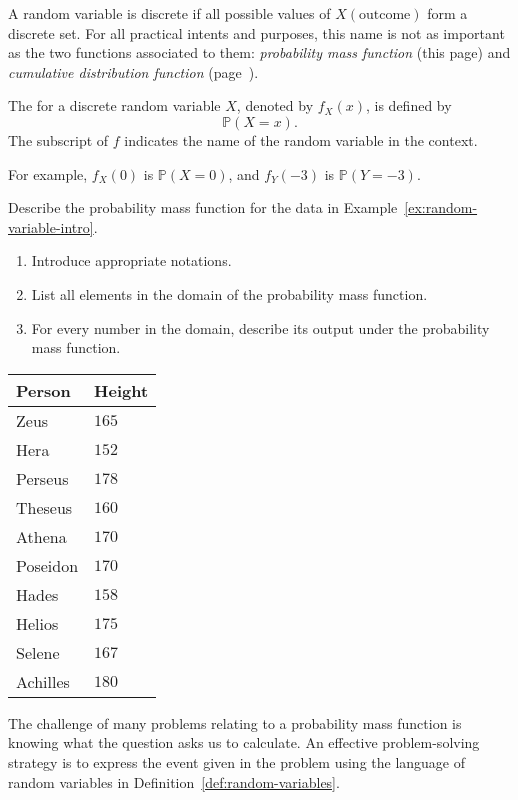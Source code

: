 \documentclass[../main.tex]{subfiles}
\begin{document}
A random variable is discrete if all possible values of \(X(\text{outcome})\) form a discrete set. For all practical intents and purposes, this name is not as important as the two functions associated to them: \emph{probability mass function} (this page) and \emph{cumulative distribution function} (page~\pageref{def:discrete-cdf}).

\begin{definition}
  The  for a discrete random variable \(X\), denoted by \(f_{X}(x)\), is defined by
  \[
    \mathbb{P}(X = x).
  \]
  The subscript of \(f\) indicates the name of the random variable in the context.

  For example, \(f_{X}(0)\) is \(\mathbb{P}(X = 0)\), and \(f_{Y}(-3)\) is \(\mathbb{P}(Y = -3)\).
\end{definition}

\begin{example}
  Describe the probability mass function for the data in Example~\ref{ex:random-variable-intro}.  
  \begin{enumerate}
    \item Introduce appropriate notations.
    \item List all elements in the domain of the probability mass function.
    \item For every number in the domain, describe its output under the probability mass function.
  \end{enumerate}

  \hfill{}
  \begin{tabular}{l|l}
    Person & Height \\\midrule
    Zeus & \(165\) \\
    Hera & \(152\) \\
    Perseus & \(178\) \\
    Theseus & \(160\) \\
    Athena & \(170\) \\
    Poseidon  & \(170\) \\
    Hades & \(158\) \\
    Helios & \(175\) \\
    Selene & \(167\) \\
    Achilles & \(180\)
  \end{tabular}
\end{example}
\clearpage

The challenge of many problems relating to a probability mass function is knowing what the question asks us to calculate.  \faStar{} An effective problem-solving strategy is to express the event given in the problem using the language of random variables in Definition~\ref{def:random-variables}. 
\end{document}

